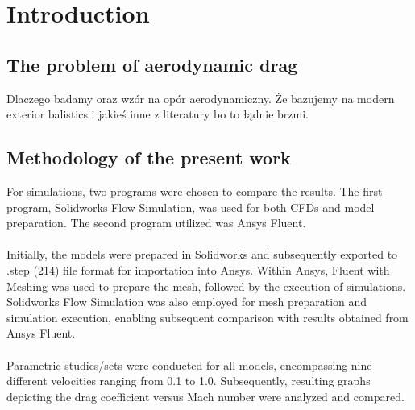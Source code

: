\documentclass{article}
\begin{document}
\section{Introduction}
\subsection{The problem of aerodynamic drag}
Dlaczego badamy oraz wzór na opór aerodynamiczny. Że bazujemy na modern exterior balistics i jakieś inne z literatury bo to łądnie brzmi.

\subsection{Methodology of the present work}
For simulations, two programs were chosen to compare the results. The first program, 
Solidworks Flow Simulation, was used for both CFDs and model preparation. The second 
program utilized was Ansys Fluent.\\\\
Initially, the models were prepared in Solidworks and subsequently exported to 
.step (214) file format for importation into Ansys. Within Ansys, Fluent with 
Meshing was used to prepare the mesh, followed by the execution of simulations. 
Solidworks Flow Simulation was also employed for mesh preparation and simulation execution, 
enabling subsequent comparison with results obtained from Ansys Fluent.\\\\
Parametric studies/sets were conducted for all models, encompassing nine different velocities
ranging from 0.1 to 1.0. Subsequently, resulting graphs depicting the drag coefficient 
versus Mach number were analyzed and compared.
\end{document}
